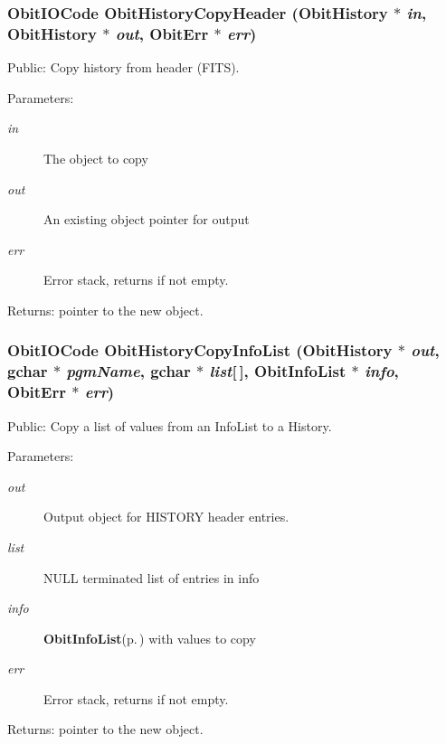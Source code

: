 \subsubsection{\setlength{\rightskip}{0pt plus 5cm}Obit\-IOCode Obit\-History\-Copy\-Header ({\bf Obit\-History} $\ast$ {\em in}, {\bf Obit\-History} $\ast$ {\em out}, {\bf Obit\-Err} $\ast$ {\em err})}\label{ObitHistory_8c_a12}


Public: Copy history from header (FITS). 

\begin{Desc}
\item[Parameters:]
\begin{description}
\item[{\em in}]The object to copy \item[{\em out}]An existing object pointer for output \item[{\em err}]Error stack, returns if not empty. \end{description}
\end{Desc}
\begin{Desc}
\item[Returns:]pointer to the new object. \end{Desc}
\subsubsection{\setlength{\rightskip}{0pt plus 5cm}Obit\-IOCode Obit\-History\-Copy\-Info\-List ({\bf Obit\-History} $\ast$ {\em out}, gchar $\ast$ {\em pgm\-Name}, gchar $\ast$ {\em list}[$\,$], {\bf Obit\-Info\-List} $\ast$ {\em info}, {\bf Obit\-Err} $\ast$ {\em err})}\label{ObitHistory_8c_a21}


Public: Copy a list of values from an Info\-List to a History. 

\begin{Desc}
\item[Parameters:]
\begin{description}
\item[{\em out}]Output object for HISTORY header entries. \item[{\em list}]NULL terminated list of entries in info \item[{\em info}]{\bf Obit\-Info\-List}{\rm (p.\,\pageref{structObitInfoList})} with values to copy \item[{\em err}]Error stack, returns if not empty. \end{description}
\end{Desc}
\begin{Desc}
\item[Returns:]pointer to the new object. \end{Desc}
